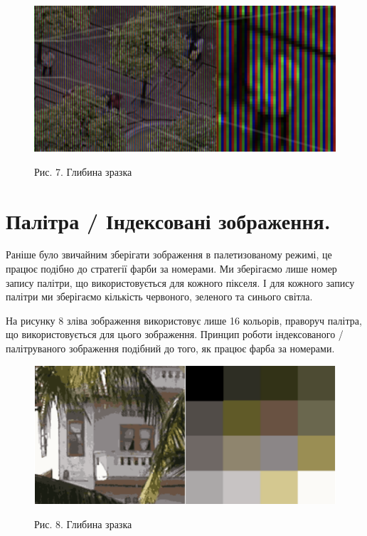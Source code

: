 \documentclass[11pt]{article}
\begin{document}
    \begin{figure}
        \label{fig:image7}
        \centering
        \includegraphics[scale=0.5]{image7.png}

        Рис. 7. Глибина зразка
    \end{figure}
    
    \section{Палітра / Індексовані зображення.}\label{sec:palette}
    Раніше було звичайним зберігати зображення в палетизованому режимі, це працює подібно до стратегії фарби за номерами.
    Ми зберігаємо лише номер запису палітри, що використовується для кожного пікселя.
    І для кожного запису палітри ми зберігаємо кількість червоного, зеленого та синього світла.

    На рисунку 8 зліва зображення використовує лише 16 кольорів, праворуч палітра, що використовується для цього зображення.
    Принцип роботи індексованого / палітруваного зображення подібний до того, як працює фарба за номерами.

    \begin{figure}
        \label{fig:image8}
        \centering
        \includegraphics[scale=0.5]{image8.png}

        Рис. 8. Глибина зразка
    \end{figure}
\end{document}
